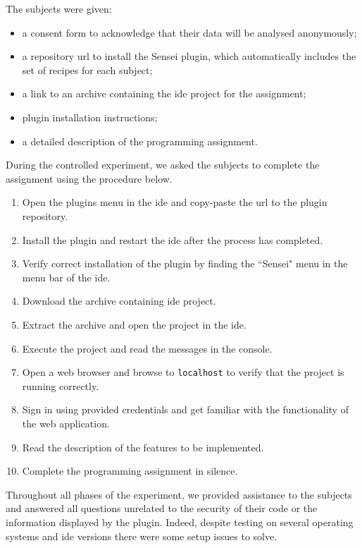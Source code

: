 The subjects were given:
\begin{itemize}[noitemsep]
    \item a consent form to acknowledge that their data will be analysed anonymously;
    \item a repository \gls{url} to install the Sensei plugin, which automatically includes the set of recipes for each subject;
    \item a link to an archive containing the \gls{ide} project for the assignment;
    \item plugin installation instructions;
    \item a detailed description of the programming assignment.
\end{itemize}

During the controlled experiment, we asked the subjects to complete the assignment using the procedure below.

\begin{enumerate}[noitemsep]
    \item Open the plugins menu in the \gls{ide} and copy-paste the \gls{url} to the plugin repository.
    \item Install the plugin and restart the \gls{ide} after the process has completed.
    \item Verify correct installation of the plugin by finding the ``Sensei" menu in the menu bar of the \gls{ide}.
    \item Download the archive containing \gls{ide} project.
    \item Extract the archive and open the project in the \gls{ide}.
    \item Execute the project and read the messages in the console.
    \item Open a web browser and browse to \texttt{localhost} to verify that the project is running correctly.
    \item Sign in using provided credentials and get familiar with the functionality of the web application.
    \item Read the description of the features to be implemented.
    \item Complete the programming assignment in silence.
\end{enumerate}

Throughout all phases of the experiment, we provided assistance to the subjects and answered all questions unrelated to the security of their code or the information displayed by the plugin.
Indeed, despite testing on several operating systems and \gls{ide} versions there were some setup issues to solve.

